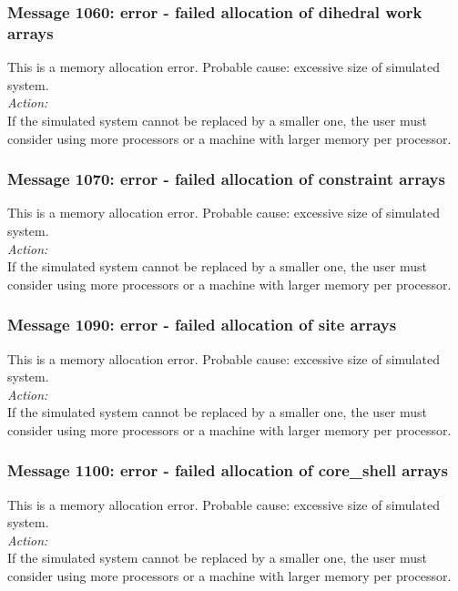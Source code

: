 \subsubsection*{Message 1060: error - failed allocation of dihedral
work arrays}

This is a memory allocation error. Probable cause: excessive size of
simulated system. \\

\noindent
{\em Action:}\\
If the simulated system cannot be replaced by a smaller one, the user
must consider using more processors or a machine with larger memory
per processor.

\subsubsection*{Message 1070: error - failed allocation of constraint
arrays}

This is a memory allocation error. Probable cause: excessive size of
simulated system. \\

\noindent
{\em Action:}\\
If the simulated system cannot be replaced by a smaller one, the user
must consider using more processors or a machine with larger memory
per processor.

\subsubsection*{Message 1090: error - failed allocation of site arrays}

This is a memory allocation error. Probable cause: excessive size of
simulated system. \\

\noindent
{\em Action:}\\
If the simulated system cannot be replaced by a smaller one, the user
must consider using more processors or a machine with larger memory
per processor.

\subsubsection*{Message 1100: error - failed allocation of core\_shell
arrays}

This is a memory allocation error. Probable cause: excessive size of
simulated system. \\

\noindent
{\em Action:}\\
If the simulated system cannot be replaced by a smaller one, the user
must consider using more processors or a machine with larger memory
per processor.

